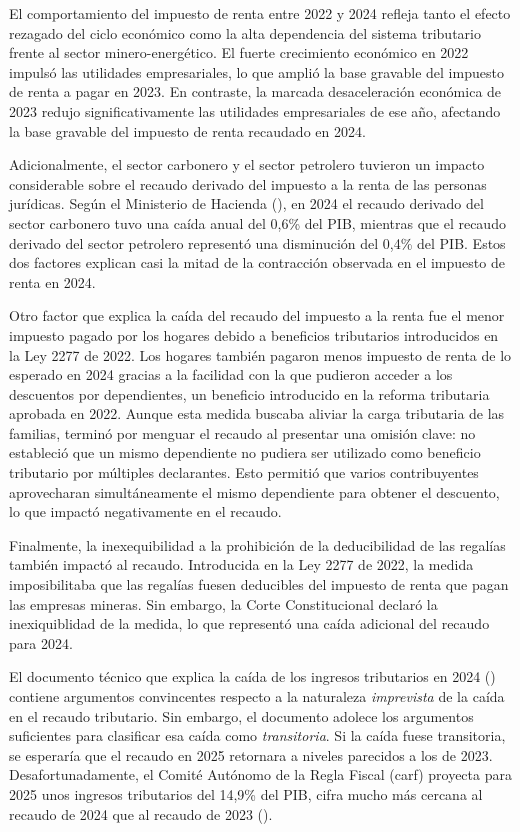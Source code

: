 El comportamiento del impuesto de renta entre 2022 y 2024 refleja tanto el efecto rezagado del ciclo económico como la alta dependencia del sistema tributario frente al sector minero-energético. El fuerte crecimiento económico en 2022 impulsó las utilidades empresariales, lo que amplió la base gravable del impuesto de renta a pagar en 2023. En contraste, la marcada desaceleración económica de 2023 redujo significativamente las utilidades empresariales de ese año, afectando la base gravable del impuesto de renta recaudado en 2024.

Adicionalmente, el sector carbonero y el sector petrolero tuvieron un impacto considerable sobre el recaudo derivado del impuesto a la renta de las personas jurídicas. Según el Ministerio de Hacienda (\cite{DocumentoTUV2024}), en 2024 el recaudo derivado del sector carbonero tuvo una caída anual del 0,6\% del PIB, mientras que el recaudo derivado del sector petrolero representó una disminución del 0,4\% del PIB. Estos dos factores explican casi la mitad de la contracción observada en el impuesto de renta en 2024.

Otro factor que explica la caída del recaudo del impuesto a la renta fue el menor impuesto pagado por los hogares debido a beneficios tributarios introducidos en la Ley 2277 de 2022. Los hogares también pagaron menos impuesto de renta de lo esperado en 2024 gracias a la facilidad con la que pudieron acceder a los descuentos por dependientes, un beneficio introducido en la reforma tributaria aprobada en 2022. Aunque esta medida buscaba aliviar la carga tributaria de las familias, terminó por menguar el recaudo al presentar una omisión clave: no estableció que un mismo dependiente no pudiera ser utilizado como beneficio tributario por múltiples declarantes. Esto permitió que varios contribuyentes aprovecharan simultáneamente el mismo dependiente para obtener el descuento, lo que impactó negativamente en el recaudo.

Finalmente, la inexequibilidad a la prohibición de la deducibilidad de las regalías también impactó al recaudo. Introducida en la Ley 2277 de 2022, la medida imposibilitaba que las regalías fuesen deducibles del impuesto de renta que pagan las empresas mineras. Sin embargo, la Corte Constitucional declaró la inexiquiblidad de la medida, lo que representó una caída adicional del recaudo para 2024.   

El documento técnico que explica la caída de los ingresos tributarios en 2024 (\cite{DocumentoTUV2024}) contiene argumentos convincentes respecto a la naturaleza \textit{imprevista} de la caída en el recaudo tributario. Sin embargo, el documento adolece los argumentos suficientes para clasificar esa caída como \textit{transitoria}. Si la caída fuese transitoria, se esperaría que el recaudo en 2025 retornara a niveles parecidos a los de 2023. Desafortunadamente, el Comité Autónomo de la Regla Fiscal (\gls{carf}) proyecta para 2025 unos ingresos tributarios del 14,9\% del PIB, cifra mucho más cercana al recaudo de 2024 que al recaudo de 2023 (\cite{CARF2025}).

